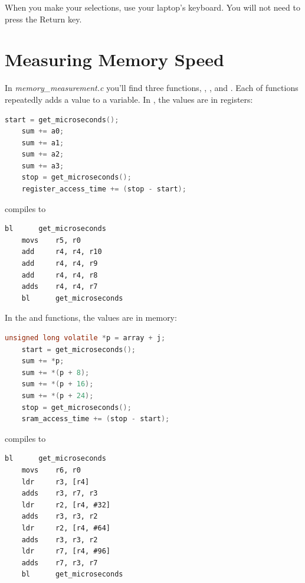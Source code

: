 
When you make your selections, use your laptop's keyboard.
You will not need to press the Return key.


\section{Measuring Memory Speed}

In \textit{memory\_measurement.c} you'll find three functions,
, , and .
Each of functions repeatedly adds a value to a variable.
In , the values are in registers:

\begin{lstlisting}[language=c]
    start = get_microseconds();
    sum += a0;
    sum += a1;
    sum += a2;
    sum += a3;
    stop = get_microseconds();
    register_access_time += (stop - start);
\end{lstlisting}

compiles to

\begin{lstlisting}[language={[ARM]Assembler}]
    bl      get_microseconds
    movs    r5, r0
    add     r4, r4, r10
    add     r4, r4, r9
    add     r4, r4, r8
    adds    r4, r4, r7
    bl      get_microseconds
\end{lstlisting}

In the  and  functions, the values are in memory:

\begin{lstlisting}[language=c]
    unsigned long volatile *p = array + j;
    start = get_microseconds();
    sum += *p;
    sum += *(p + 8);
    sum += *(p + 16);
    sum += *(p + 24);
    stop = get_microseconds();
    sram_access_time += (stop - start);
\end{lstlisting}

compiles to

\begin{lstlisting}[language={[ARM]Assembler}]
    bl      get_microseconds
    movs    r6, r0
    ldr     r3, [r4]
    adds    r3, r7, r3
    ldr     r2, [r4, #32]
    adds    r3, r3, r2
    ldr     r2, [r4, #64]
    adds    r3, r3, r2
    ldr     r7, [r4, #96]
    adds    r7, r3, r7
    bl      get_microseconds
\end{lstlisting}

